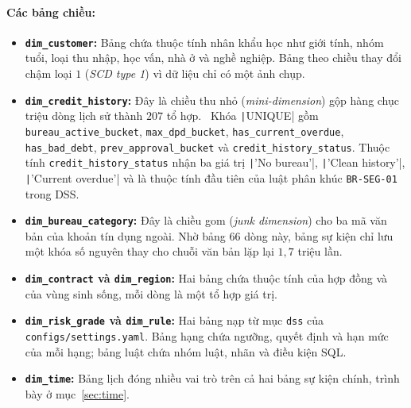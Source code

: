\paragraph{Các bảng chiều:}
\begin{itemize}[topsep=0pt, itemsep=1pt]
	\item \textbf{\texttt{dim\_customer}:} Bảng chứa thuộc tính nhân khẩu học như giới tính, nhóm tuổi, loại thu nhập, học vấn, nhà ở và nghề nghiệp. Bảng theo chiều thay đổi chậm loại $1$ (\textit{SCD type 1}) vì dữ liệu chỉ có một ảnh chụp.
	\item \textbf{\texttt{dim\_credit\_history}:} Đây là chiều thu nhỏ (\textit{mini-dimension}) gộp hàng chục triệu dòng lịch sử thành $207$ tổ hợp.~\cite{kimball2013} Khóa \texttt|UNIQUE| gồm \texttt{bureau\_active\_bucket}, \texttt{max\_dpd\_bucket}, \texttt{has\_current\_overdue}, \texttt{has\_bad\_debt}, \texttt{prev\_approval\_bucket} và \texttt{credit\_history\_status}. Thuộc tính \texttt{credit\_history\_status} nhận ba giá trị \texttt|'No bureau'|, \texttt|'Clean history'|, \texttt|'Current overdue'| và là thuộc tính đầu tiên của luật phân khúc \texttt{BR-SEG-01} trong DSS.
	\item \textbf{\texttt{dim\_bureau\_category}:} Đây là chiều gom (\textit{junk dimension}) cho ba mã văn bản của khoản tín dụng ngoài. Nhờ bảng $66$ dòng này, bảng sự kiện chỉ lưu một khóa số nguyên thay cho chuỗi văn bản lặp lại $1{,}7$ triệu lần.
	\item \textbf{\texttt{dim\_contract} và \texttt{dim\_region}:} Hai bảng chứa thuộc tính của hợp đồng và của vùng sinh sống, mỗi dòng là một tổ hợp giá trị.
	\item \textbf{\texttt{dim\_risk\_grade} và \texttt{dim\_rule}:} Hai bảng nạp từ mục \texttt{dss} của \texttt{configs/settings.yaml}. Bảng hạng chứa ngưỡng, quyết định và hạn mức của mỗi hạng; bảng luật chứa nhóm luật, nhãn và điều kiện SQL.
	\item \textbf{\texttt{dim\_time}:} Bảng lịch đóng nhiều vai trò trên cả hai bảng sự kiện chính, trình bày ở mục~\ref{sec:time}.
\end{itemize}


